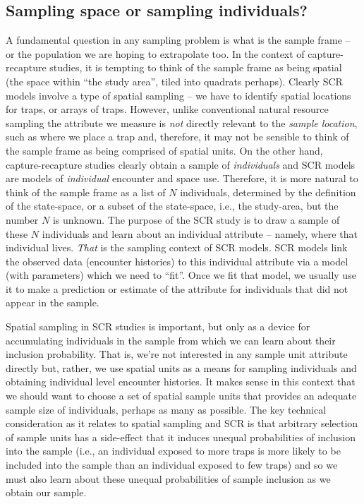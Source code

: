 \subsection{Sampling space or sampling individuals?}

A fundamental question in any sampling problem is what is the sample
frame -- or the population we are hoping to extrapolate too. In the
context of capture-recapture studies, it is tempting to think of the
sample frame as being spatial (the space within ``the study area'',
tiled into quadrats perhaps).  Clearly SCR models involve a type of
spatial sampling -- we have to identify spatial locations for traps,
or arrays of traps.  However, unlike conventional natural resource
sampling the attribute we measure is {\it not} directly relevant to
the {\it sample location}, such as where we place a trap and,
therefore, it may not be sensible to think of the sample frame as
being comprised of spatial units.
On the other hand,
capture-recapture studies clearly obtain a sample of {\it individuals}
and SCR models are models of {\it individual} encounter and space use.
Therefore, it is more natural to think of the sample frame as a list
of $N$ individuals, determined by the definition of the state-space,
or a subset of the state-space, i.e., the study-area, but the number
$N$ is unknown. The purpose of the SCR study is to draw a sample of
these $N$ individuals and learn about an individual attribute --
namely, where that individual lives. {\it That} is the sampling
context of SCR models.  SCR models link the observed data (encounter
histories) to this individual attribute via a model (with parameters)
which we need to ``fit''. Once we fit that model, we usually use it to make a
prediction or estimate of the attribute for individuals that did not
appear in the sample.


Spatial sampling in SCR studies is important, but only as a device for
accumulating individuals in the sample from which we can learn about
their inclusion probability. That is, we're not interested in any
sample unit attribute directly but, rather, we use spatial units as a
means for sampling individuals and obtaining individual level
encounter histories.
It makes sense in this context that we should
want to choose a set of spatial sample units that provides an adequate
sample size of individuals, perhaps as many as possible. The key
technical consideration as it relates to spatial sampling and SCR is
that arbitrary selection of sample units has a side-effect that it
induces unequal probabilities of inclusion into the sample (i.e., an
individual exposed to more traps is more likely to be included into
the sample than an individual exposed to few traps) and so we must
also learn about these unequal probabilities of sample inclusion as we
obtain our sample.

